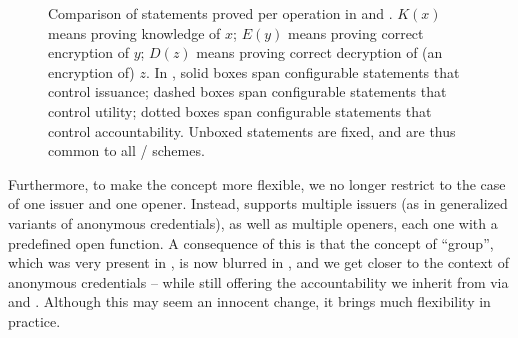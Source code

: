 \begin{figure}[ht!]
  
  \caption{Comparison of statements proved per operation in \GSAC and \UAS.
    $K(x)$ means proving knowledge of $x$; $E(y)$ means proving correct
    encryption of $y$; $D(z)$ means proving correct decryption of (an encryption
    of) $z$. In \UAS, solid boxes span configurable statements that control
    issuance; dashed boxes span configurable statements that control utility;
    dotted boxes span configurable statements that control accountability.
    Unboxed statements are fixed, and are thus common to all \GSAC/\UAS
    schemes.}
  \label{fig:proof-blocks-uas}
\end{figure}

Furthermore, to make the concept more flexible, we no longer restrict to the
case of one issuer and one opener. Instead, \UAS supports multiple issuers (as
in generalized variants of anonymous credentials), as well as multiple openers,
each one with a predefined open function. 
A consequence of this is that the concept of ``group'', which was very present
in \GSAC, is now blurred in \UAS, and we get closer to the context of anonymous
credentials -- while still offering the accountability we inherit from \GSAC
via \Open and \Judge.
%
Although this may seem an innocent change, it brings much flexibility in
practice.






